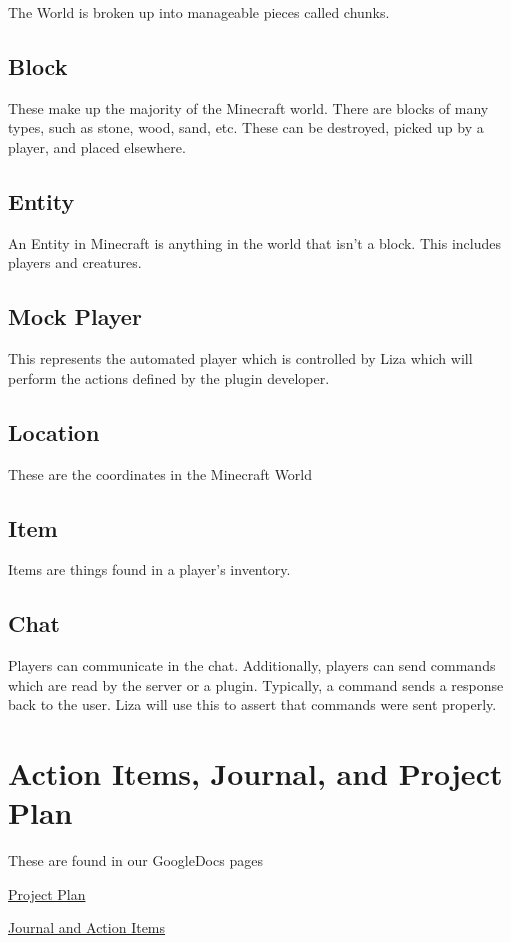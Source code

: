 \documentclass{article}
\begin{document}
The World is broken up into manageable pieces called chunks.

\subsection*{Block}

These make up the majority of the Minecraft world. There are blocks
of many types, such as stone, wood, sand, etc. These can be destroyed,
picked up by a player, and placed elsewhere.

\subsection*{Entity}

An Entity in Minecraft is anything in the world that isn't a block. This 
includes players and creatures.

\subsection*{Mock Player}

This represents the automated player which is controlled by Liza which will 
perform the actions defined by the plugin developer.

\subsection*{Location}

These are the coordinates in the Minecraft World

\subsection*{Item}

Items are things found in a player's inventory. 

\subsection*{Chat}

Players can communicate in the chat. Additionally, players can send commands
which are read by the server or a plugin. Typically, a command sends a response
back to the user. Liza will use this to assert that commands were sent properly.

\newpage

\section*{Action Items, Journal, and Project Plan}

These are found in our GoogleDocs pages

\href{https://docs.google.com/spreadsheet/ccc?key=0AjcjuiCChut1dGtnWlJqenU4ZDVENVdqUF9MWXVUWkE&hl=en_US#gid=0}{Project Plan}

\href{https://docs.google.com/document/d/1CwvcygEuj-zBrKCGxQtA8553bFEjGDdcFIdGDqVEmtA/edit?hl=en_US}{Journal and Action Items}
\end{document}
